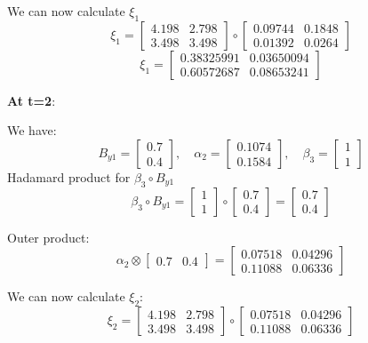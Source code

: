We can now calculate $\xi_1$
\[
\xi_1 = \begin{bmatrix}
    4.198 & 2.798 \\ 3.498 & 3.498
\end{bmatrix} \circ \begin{bmatrix}
    0.09744 & 0.1848 \\ 0.01392 & 0.0264
\end{bmatrix} \] \[ \xi_1 = \begin{bmatrix}
    0.38325991 & 0.03650094 \\ 0.60572687 & 0.08653241
\end{bmatrix}
\]

\textbf{At t=2}:

We have:
\[
B_{y1} = \begin{bmatrix}
    0.7 \\ 0.4
\end{bmatrix}, \quad \alpha_2 = \begin{bmatrix}
    0.1074 \\ 0.1584
\end{bmatrix}, \quad \beta_3 = \begin{bmatrix}
    1 \\ 1
\end{bmatrix}
\]
Hadamard product for $\beta_3 \circ B_{y1}$
\[
\beta_3 \circ B_{y1} = \begin{bmatrix}
    1 \\ 1
\end{bmatrix} \circ \begin{bmatrix}
    0.7 \\ 0.4
\end{bmatrix} = \begin{bmatrix}
    0.7 \\ 0.4
\end{bmatrix}
\]

Outer product:
\[
\alpha_2 \otimes \begin{bmatrix}
    0.7 & 0.4
\end{bmatrix} = \begin{bmatrix}
    0.07518 & 0.04296 \\ 0.11088 & 0.06336
\end{bmatrix}
\]

We can now calculate $\xi_2$:
\[
\xi_2 = 
\begin{bmatrix}
    4.198 & 2.798 \\ 3.498 & 3.498
\end{bmatrix} \circ \begin{bmatrix}
    0.07518 & 0.04296 \\ 0.11088 & 0.06336
\end{bmatrix} 
\] 


